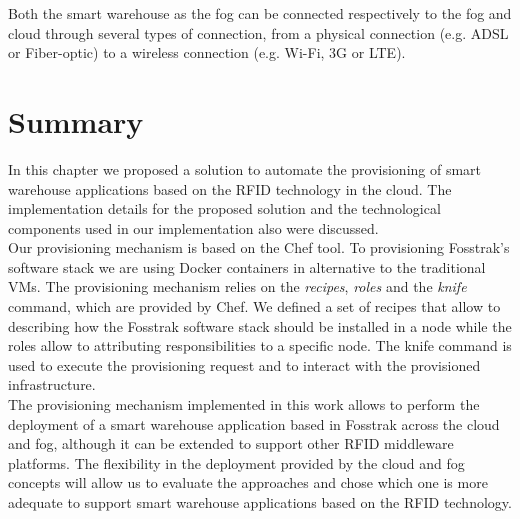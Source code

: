 Both the smart warehouse as the fog can be connected respectively to the fog and cloud through several
types of connection, from a physical connection (e.g. \gls{ADSL} or Fiber-optic) to a wireless connection
(e.g. Wi-Fi, 3G or \gls{LTE}).

\section{Summary}
\label{sec:sol_summary}
In this chapter we proposed a solution to automate the provisioning of smart warehouse applications
based on the \gls{RFID} technology in the cloud. The implementation details for the proposed
solution and the technological components used in our implementation also were discussed.\\

Our provisioning mechanism is based on the Chef tool. To provisioning Fosstrak's software stack we are
using Docker containers in alternative to the traditional \glspl{VM}. The provisioning mechanism relies
on the \textit{recipes}, \textit{roles} and the \textit{knife} command, which are provided by Chef.
We defined a set of recipes that allow to describing how the Fosstrak software stack should be installed
in a node while the roles allow to attributing responsibilities to a specific node. The knife command
is used to execute the provisioning request and to interact with the provisioned infrastructure.\\

The provisioning mechanism implemented in this work allows to perform the deployment of a smart warehouse
application based in Fosstrak across the cloud and fog, although it can be extended to support other
\gls{RFID} middleware platforms. The flexibility in the deployment provided by the cloud and fog
concepts will allow us to evaluate the approaches and chose which one is more adequate to support smart
warehouse applications based on the \gls{RFID} technology.
